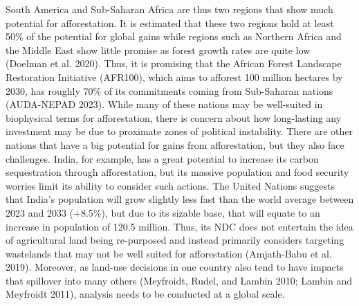 \documentclass[
]{article}
\begin{document}
South America and Sub-Saharan Africa are thus two regions that show much potential for afforestation. It is estimated that these two regions hold at least 50\% of the potential for global gains while regions such as Northern Africa and the Middle East show little promise as forest growth rates are quite low (Doelman et al. 2020). Thus, it is promising that the African Forest Landscape Restoration Initiative (AFR100), which aims to afforest 100 million hectares by 2030, has roughly 70\% of its commitments coming from Sub-Saharan nations (AUDA-NEPAD 2023). While many of these nations may be well-suited in biophysical terms for afforestation, there is concern about how long-lasting any investment may be due to proximate zones of political instability. There are other nations that have a big potential for gains from afforestation, but they also face challenges. India, for example, has a great potential to increase its carbon sequestration through afforestation, but its massive population and food security worries limit its ability to consider such actions. The United Nations suggests that India's population will grow slightly less fast than the world average between 2023 and 2033 (+8.5\%), but due to its sizable base, that will equate to an increase in population of 120.5 million. Thus, its NDC does not entertain the idea of agricultural land being re-purposed and instead primarily considers targeting wastelands that may not be well suited for afforestation (Amjath-Babu et al. 2019). Moreover, as land-use decisions in one country also tend to have impacts that spillover into many others (Meyfroidt, Rudel, and Lambin 2010; Lambin and Meyfroidt 2011), analysis needs to be conducted at a global scale.
\end{document}
